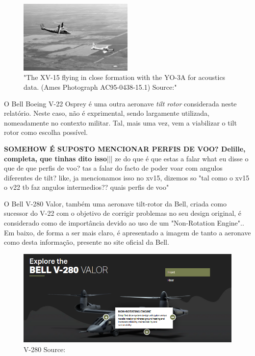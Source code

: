 \FloatBarrier
\begin{figure}[h]
    \centering
    \includegraphics[width=0.5\textwidth]{Imagens/xv-15 cruise.PNG}
    \caption{"The XV-15 flying in close
formation with the YO-3A
for acoustics data.
(Ames Photograph
AC95-0438-15.1) Source:\cite{Maisel2001-fz}"}
    \label{fig:my_label}
\end{figure}
\FloatBarrier
O Bell Boeing V-22 Osprey é uma outra aeronave \textit{tilt rotor} considerada neste relatório. Neste caso, não é exprimental, sendo largamente utilizada, nomeadamente no contexto militar. Tal, mais uma vez, vem a viabilizar o tilt rotor como escolha possível.\par
{\large{\textbf{SOMEHOW É SUPOSTO MENCIONAR PERFIS DE VOO? Delille, completa, que tinhas dito isso}||| ze do que é que estas a falar what eu disse o que de que perfis de voo? tas a falar do facto de poder voar com angulos diferentes de tilt? like, ja mencionamos isso no xv15, dizemos so "tal como o xv15 o v22 tb faz angulos intermedios?? quais perfis de voo"}}\par
O Bell V-280 Valor, também uma aeronave tilt-rotor da Bell, criada como sucessor do V-22 com o objetivo de corrigir problemas no seu design original, é considerado como de importância devido ao uso de um "Non-Rotation Engine".\cite{noauthor_undated-gb}. Em baixo, de forma a ser mais claro, é apresentado a imagem de tanto a aeronave como desta informação, presente no site oficial da Bell.\par
\FloatBarrier
\begin{figure}[h]
    \centering
    \includegraphics{Imagens/v_280.PNG}
    \caption{V-280 Source:\cite{noauthor_undated-gb}}
    \label{v-280}
\end{figure}
